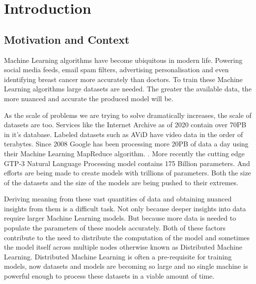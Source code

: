 
\section{Introduction}

\subsection{Motivation and Context}

Machine Learning algorithms have become ubiquitous in modern life. Powering
social media feeds, email spam filters, advertising personalisation and even
identifying breast cancer more accurately than doctors. \cite{Mammograms2020} To
train these Machine Learning algorithms large datasets are needed. The greater
the available data, the more nuanced and accurate the produced model will be.
\par

As the scale of problems we are trying to solve dramatically increases, the
scale of datasets are too. Services like the Internet Archive as of 2020 contain
over 70PB in it's database. Labeled datasets such as AViD have video data in the
order of terabytes. \cite{piergiovanni2020avid} Since 2008 Google has been
processing more 20PB of data a day using their Machine Learning MapReduce
algorithm. \cite{googlemapreduce2008}. More recently the cutting edge GTP-3
Natural Language Processing model contains 175 Billion parameters.
\cite{fewshowlearners2020gpt} And efforts are being made to create models with
trillions of parameters. \cite{rajbhandari2020zero} Both the size of the
datasets and the size of the models are being pushed to their extremes.
\par

Deriving meaning from these vast quantities of data and obtaining nuanced
insights from them is a difficult task. Not only because deeper insights into
data require larger Machine Learning models. But because more data is needed to
populate the parameters of these models accurately. Both of these factors
contribute to the need to distribute the computation of the model and sometimes
the model itself across multiple nodes otherwise known as Distributed Machine
Learning. Distributed Machine Learning is often a pre-requisite for training
models, now datasets and models are becoming so large and no single machine is
powerful enough to process these datasets in a viable amount of time.
\cite{LI2014ParameterServers}
\par

